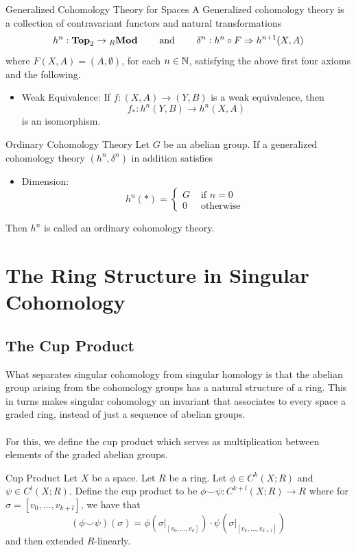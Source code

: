 \documentclass[a4paper]{article}
\begin{document}
\begin{defn}{Generalized Cohomology Theory for Spaces}{} A Generalized cohomology theory is a collection of contravariant functors and natural transformations $$h^n:\bold{Top}_2\to{_R\bold{Mod}}\;\;\;\;\;\;\;\text{ and }\;\;\;\;\;\;\;\delta^n:h^n\circ F\Rightarrow h^{n+1}(X,A)$$ where $F(X,A)=(A,\emptyset)$, for each $n\in\mathbb{N}$, satisfying the above first four axioms and the following. 
\begin{itemize}
\item Weak Equivalence: If $f:(X,A)\to(Y,B)$ is a weak equivalence, then $$f_\ast:h^n(Y,B)\to h^n(X,A)$$ is an isomorphism. 
\end{itemize}
\end{defn}

\begin{defn}{Ordinary Cohomology Theory}{} Let $G$ be an abelian group. If a generalized cohomology theory $(h^n,\delta^n)$ in addition satisfies 
\begin{itemize}
\item Dimension: $$h^n(\ast)=\begin{cases}
G & \text{ if } n=0\\
0 & \text{ otherwise }
\end{cases}$$
\end{itemize}
Then $h^n$ is called an ordinary cohomology theory. 
\end{defn}

\pagebreak
\section{The Ring Structure in Singular Cohomology}
\subsection{The Cup Product}
What separates singular cohomology from singular homology is that the abelian group arising from the cohomology groups has a natural structure of a ring. This in turns makes singular cohomology an invariant that associates to every space a graded ring, instead of just a sequence of abelian groups. \\~\\

For this, we define the cup product which serves as multiplication between elements of the graded abelian groups. 

\begin{defn}{Cup Product}{} Let $X$ be a space. Let $R$ be a ring. Let $\phi\in C^k(X;R)$ and $\psi\in C^l(X;R)$. Define the cup product to be $\phi\smile\psi:C^{k+l}(X;R)\to R$ where for $\sigma=[v_0,\dots,v_{k+l}]$, we have that $$(\phi\smile\psi)(\sigma)=\phi(\sigma|_{[v_0,\dots,v_k]})\cdot\psi(\sigma|_{[v_k,\dots,v_{k+l}]})$$ and then extended $R$-linearly. 
\end{defn}
\end{document}
